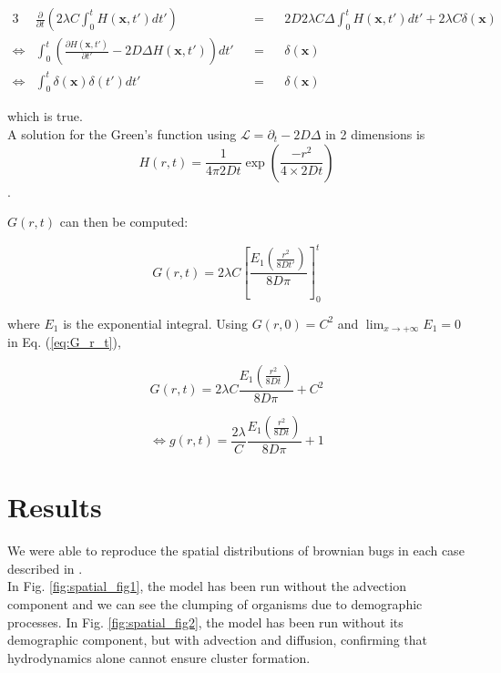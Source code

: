 \begin{alignat}{3}
 & \frac{\partial}{\partial t}\left(2\lambda C\int_{0}^{t}H(\boldsymbol{x},t')dt'\right) & & = & & 2D2\lambda C\Delta\int_{0}^{t}H(\boldsymbol{x},t')dt'+2\lambda C\delta(\boldsymbol{x})\\
\Leftrightarrow & \int_{0}^{t}\left(\frac{\partial H(\boldsymbol{x},t')}{\partial t'}-2D\Delta H(\boldsymbol{x},t')\right)dt' & & = & & \delta(\boldsymbol{x})\\
\Leftrightarrow & \int_{0}^{t}\delta(\boldsymbol{x})\delta(t')dt' & & = & & \delta(\boldsymbol{x})
\end{alignat}

which is true. \\

A solution for the Green's function using $\mathcal{L}=\partial_{t}-2D\Delta$
in 2 dimensions is $$H(r,t)=\frac{1}{4\pi2Dt}\exp(\frac{-r^{2}}{4\times2Dt})$$. 

$G(r,t)$ can then be computed:

\begin{equation}
G(r,t)=2\lambda C\left[\frac{E_1 \left(\frac{r^{2}}{8Dt'}\right)}{8D\pi}\right]_{0}^{t}\label{eq:G_r_t}
\end{equation}

where $E_1$ is the exponential integral. Using $G(r,0)=C^{2}$ and
$\lim_{x\rightarrow+\infty}E_1=0$ in Eq. (\ref{eq:G_r_t}), 

\begin{equation}
G(r,t)=2\lambda C\frac{E_1\left(\frac{r^{2}}{8Dt}\right)}{8D\pi}+C^{2}
\end{equation}

\begin{equation}
\Leftrightarrow g(r,t)=\frac{2\lambda}{C}\frac{E_1\left(\frac{r^{2}}{8Dt}\right)}{8D\pi}+1
\end{equation}

\section*{Results}

We were able to reproduce the spatial distributions of brownian bugs in each case described in \cite{young_reproductive_2001}.\\

In Fig. \ref{fig:spatial_fig1}, the model has been run without the advection component and we can see the clumping of organisms due to demographic processes. In Fig. \ref{fig:spatial_fig2}, the model has been run without its demographic component, but with advection and diffusion, confirming that hydrodynamics alone cannot ensure cluster formation.  

